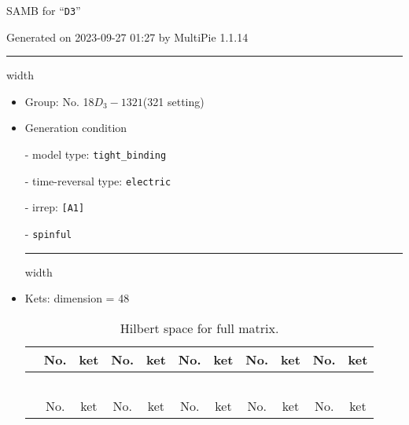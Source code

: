\documentclass[fleqn,10pt,landscape]{article}
\begin{document}
\setcounter{MaxMatrixCols}{16}

\setlength{\baselineskip}{16pt}
\footnotesize
\begin{center}
\LARGE
SAMB for ``\texttt{D3}''
\end{center}
\begin{flushright}
Generated on 2023-09-27 01:27 by MultiPie 1.1.14
\end{flushright}
\vspace{1cm}


 \hfil \hrule height 1mm width \textwidth \hfil

\begin{itemize}
\item Group: No. 18\quad$D_{3}-1$\quad$321$\quad(321 setting)\quad[ trigonal ]

\vspace{5mm}

\item Generation condition

\quad - model type: \texttt{tight_binding}

\quad - time-reversal type: \texttt{electric}

\quad - irrep: \texttt{[A1]}

\quad - \texttt{spinful}


 \hfil \hrule height 1mm width \textwidth \hfil

\item Kets: dimension = 48
\begin{center}
\renewcommand{\arraystretch}{1.3}
\begin{longtable}{c|cc|cc|cc|cc|cc}
\caption{Hilbert space for full matrix.}
 \\
 \hline \hline
 & No. & ket & No. & ket & No. & ket & No. & ket & No. & ket \\ \hline \endfirsthead

\multicolumn{10}{l}{\tablename\ \thetable{}} \\
 \hline \hline
 & No. & ket & No. & ket & No. & ket & No. & ket & No. & ket \\ \hline \endhead


\end{longtable}
\end{center}
\end{itemize}
\end{document}
